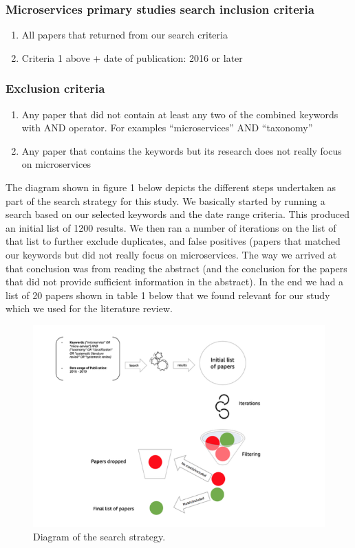 \documentclass{article}
\begin{document}
\subsubsection{Microservices primary studies search inclusion criteria}

\begin{enumerate} 


\item All papers that returned from our search criteria
\item Criteria 1 above + date of publication: 2016 or later
\end{enumerate}

\subsubsection{Exclusion criteria}


\begin{enumerate}


\item Any paper that did not contain at least any two of the combined keywords with AND operator. For examples “microservices” AND “taxonomy”
\item Any paper that contains the keywords but its research does not really focus on microservices 
\end{enumerate} 

The diagram shown in figure 1 below depicts the different steps undertaken as part of the search strategy for this study. We basically started by running a search based on our selected keywords and the date range criteria. This produced an initial list of 1200 results. We then ran a number of iterations on the list of that list to further exclude duplicates, and false positives (papers that matched our keywords but did not really focus on microservices. The way we arrived at that conclusion was from reading the abstract (and the conclusion for the papers that did not provide sufficient information in the abstract). In the end we had a list of 20 papers shown in table 1 below that we found relevant for our study which we used for the literature review.


\begin{figure}[h!]
\includegraphics{searchstrategy.png}
\caption{Diagram of the search strategy.}
\end{figure}
\end{document}
